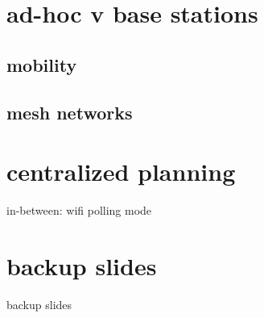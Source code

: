 \section{ad-hoc v base stations}


\subsection{mobility}


\subsection{mesh networks}


\section{centralized planning}


\begin{frame}{in-between: wifi polling mode}
\end{frame}



\section{backup slides}
\begin{frame}{backup slides}
\end{frame}



